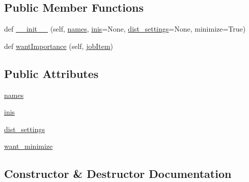 \subsection*{Public Member Functions}
\begin{DoxyCompactItemize}
\item 
def \mbox{\hyperlink{classparamgrid_1_1batchjob_1_1importanceSetting_a60228416b35b02411f577f6603a7cb35}{\+\_\+\+\_\+init\+\_\+\+\_\+}} (self, \mbox{\hyperlink{classparamgrid_1_1batchjob_1_1importanceSetting_aad48899b24770a87790b8fb910e99282}{names}}, \mbox{\hyperlink{classparamgrid_1_1batchjob_1_1importanceSetting_a06e4d8931b872ae36745e3cc33c4cb9c}{inis}}=None, \mbox{\hyperlink{classparamgrid_1_1batchjob_1_1importanceSetting_a571430cb04a24dbd15951c65fc319589}{dist\+\_\+settings}}=None, minimize=True)
\item 
def \mbox{\hyperlink{classparamgrid_1_1batchjob_1_1importanceSetting_ad12747e01c947baffedfb12fd51a58d3}{want\+Importance}} (self, \mbox{\hyperlink{classparamgrid_1_1batchjob_1_1jobItem}{job\+Item}})
\end{DoxyCompactItemize}
\subsection*{Public Attributes}
\begin{DoxyCompactItemize}
\item 
\mbox{\hyperlink{classparamgrid_1_1batchjob_1_1importanceSetting_aad48899b24770a87790b8fb910e99282}{names}}
\item 
\mbox{\hyperlink{classparamgrid_1_1batchjob_1_1importanceSetting_a06e4d8931b872ae36745e3cc33c4cb9c}{inis}}
\item 
\mbox{\hyperlink{classparamgrid_1_1batchjob_1_1importanceSetting_a571430cb04a24dbd15951c65fc319589}{dist\+\_\+settings}}
\item 
\mbox{\hyperlink{classparamgrid_1_1batchjob_1_1importanceSetting_ad80707971e265f94948d547736a4b3a8}{want\+\_\+minimize}}
\end{DoxyCompactItemize}


\subsection{Constructor \& Destructor Documentation}
\mbox{\label{classparamgrid_1_1batchjob_1_1importanceSetting_a60228416b35b02411f577f6603a7cb35}} 
